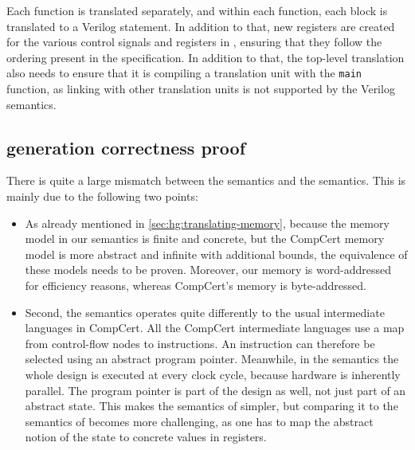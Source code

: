 Each \rtlsubpar{} function is translated separately, and within each function,
each block is translated to a Verilog statement.  In addition to that, new
registers are created for the various control signals and registers in \htl{},
ensuring that they follow the ordering present in the \htl{} specification.  In
addition to that, the top-level translation also needs to ensure that it is
compiling a translation unit with the \texttt{main} function, as linking with
other translation units is not supported by the Verilog semantics.

\subsection{\htl{} generation correctness proof}%
\label{sec:hg:htl-generation-correctness-proof}


There is quite a large mismatch between the \htl{} semantics and the
\rtlsubpar{} semantics.  This is mainly due to the following two points:

\begin{itemize}
\item As already mentioned in \cref{sec:hg:translating-memory}, because the
  memory model in our \htl{} semantics is finite and concrete, but the CompCert
  memory model is more abstract and infinite with additional bounds, the
  equivalence of these models needs to be proven.  Moreover, our memory is
  word-addressed for efficiency reasons, whereas CompCert's memory is
  byte-addressed.

\item Second, the \htl{} semantics operates quite differently to the usual
  intermediate languages in CompCert.  All the CompCert intermediate languages
  use a map from control-flow nodes to instructions.  An instruction can
  therefore be selected using an abstract program pointer. Meanwhile, in the
  \htl{} semantics the whole design is executed at every clock cycle, because
  hardware is inherently parallel. The program pointer is part of the design as
  well, not just part of an abstract state. This makes the semantics of \htl{}
  simpler, but comparing it to the semantics of \rtl{} becomes more challenging,
  as one has to map the abstract notion of the state to concrete values in
  registers.
\end{itemize}


